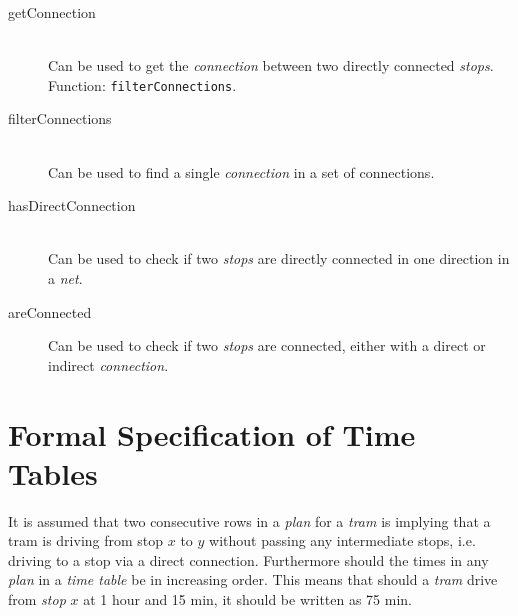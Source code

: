 \documentclass[a4]{article}
\begin{document}
\begin{description}
    \item[getConnection] \hfill \\ Can be used to get the \emph{connection} between two directly connected \emph{stops}. Function: \verb=filterConnections=.
    \item[filterConnections] \hfill \\ Can be used to find a single \emph{connection} in a set of connections.
    \item[hasDirectConnection] \hfill \\ Can be used to check if two \emph{stops} are directly connected in one direction in a \emph{net}.
    \item[areConnected] Can be used to check if two \emph{stops} are connected, either with a direct or indirect \emph{connection}.
\end{description}  

\section{Formal Specification of Time Tables}



\noindent It is assumed that two consecutive rows in a \emph{plan} for a \emph{tram} is implying that a tram is driving from stop $x$ to $y$ without passing any intermediate stops, i.e. driving to a stop via a direct connection. Furthermore should the times in any \emph{plan} in a \emph{time table} be in increasing order. This means that should a \emph{tram} drive from \emph{stop} $x$ at 1 hour and 15 min, it should be written as 75 min. \\
\end{document}
